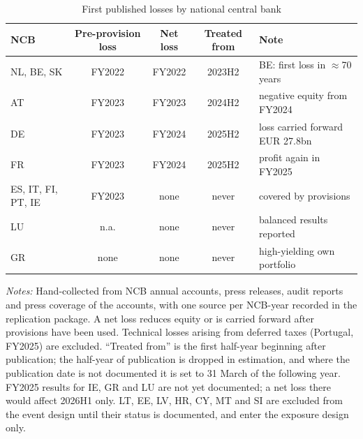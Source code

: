 \documentclass[11pt]{article}
\theoremstyle{plain}
\begin{document}
\begin{table}[t]\centering\small
\begin{threeparttable}
\caption{First published losses by national central bank}\label{tab:losses}
\begin{tabular}{lcccl}
\toprule
NCB & Pre-provision loss & Net loss & Treated from & Note \\
\midrule
NL, BE, SK & FY2022 & FY2022 & 2023H2 & BE: first loss in $\approx$70 years \\
AT & FY2023 & FY2023 & 2024H2 & negative equity from FY2024 \\
DE & FY2023 & FY2024 & 2025H2 & loss carried forward EUR 27.8bn \\
FR & FY2023 & FY2024 & 2025H2 & profit again in FY2025 \\
ES, IT, FI, PT, IE & FY2023 & none & never & covered by provisions \\
LU & n.a. & none & never & balanced results reported \\
GR & none & none & never & high-yielding own portfolio \\
\bottomrule
\end{tabular}
\begin{tablenotes}\footnotesize
\item \textit{Notes:} Hand-collected from NCB annual accounts, press releases, audit reports and press coverage of the accounts, with one source per NCB-year recorded in the replication package. A net loss reduces equity or is carried forward after provisions have been used. Technical losses arising from deferred taxes (Portugal, FY2025) are excluded. ``Treated from'' is the first half-year beginning after publication; the half-year of publication is dropped in estimation, and where the publication date is not documented it is set to 31 March of the following year. FY2025 results for IE, GR and LU are not yet documented; a net loss there would affect 2026H1 only. LT, EE, LV, HR, CY, MT and SI are excluded from the event design until their status is documented, and enter the exposure design only.
\end{tablenotes}
\end{threeparttable}
\end{table}
\end{document}
